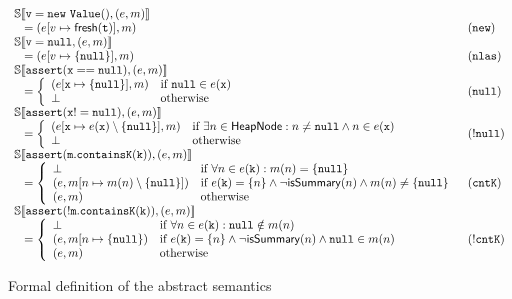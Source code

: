 \begin{figure*}
\[\begin{array}{ll}
\mathbb{S}\llbracket \mathtt{v = new\ Value()}, (e, m) \rrbracket\\
\;\;\;=  (e[v \mapsto \mathsf{fresh}(\mathtt{t})], m)& (\mathtt{new})\\
\mathbb{S}\llbracket \mathtt{v = null}, (e, m) \rrbracket\\
\;\;\;= (e[v \mapsto \{\mathtt{null}\}], m)& (\mathtt{nlas})\\
\mathbb{S}\llbracket \mathtt{assert(x==null)}, (e, m) \rrbracket\\
\;\;\;= \left\{
\begin{array}{ll}
(e[\mathtt{x} \mapsto \{\mathtt{null}\}], m) & \textrm{if } \mathtt{null} \in e(\mathtt{x})\\
\bot & \textrm{otherwise}\\
\end{array}
\right. & (\mathtt{null})\\
\mathbb{S}\llbracket \mathtt{assert(x!=null)}, (e, m) \rrbracket \\
\;\;\;=\left\{
\begin{array}{ll}
(e[\mathtt{x} \mapsto e(\mathtt{x}) \setminus \{\mathtt{null}\}], m) & \textrm{if } \exists n \in \mathsf{HeapNode} : n \neq \mathtt{null} \land n \in e(\mathtt{x})\\
\bot & \textrm{otherwise}\\
\end{array}
\right. & (\mathtt{!null})\\
\mathbb{S}\llbracket \mathtt{assert(m.containsK(k))}, (e, m) \rrbracket\\
\;\;\;= \left\{
\begin{array}{ll}
\bot & \textrm{if } \forall n \in e(\mathtt{k}) : m(n)=\{\mathtt{null}\}\\
(e, m[n \mapsto m(n)\setminus\{\mathtt{null}\}]) & \textrm{if } e(\mathtt{k}) = \{n\} \land \neg \mathsf{isSummary}(n) \land  m(n) \neq \{\mathtt{null}\}\\
(e, m) & \textrm{otherwise}\\
\end{array}
\right. & (\mathtt{cntK})\\
\mathbb{S}\llbracket \mathtt{assert(!m.containsK(k))}, (e, m) \rrbracket\\
\;\;\;= \left\{
\begin{array}{ll}
\bot & \textrm{if } \forall n \in e(\mathtt{k}) : \mathtt{null} \notin m(n)\\
(e, m[n \mapsto \{\mathtt{null}\}) & \textrm{if } e(\mathtt{k}) = \{n\} \land \neg \mathsf{isSummary}(n) \land \mathtt{null} \in m(n)\\
(e, m) & \textrm{otherwise}\\
\end{array}
\right. & (\mathtt{!cntK})\\
\end{array}
\]
\caption{Formal definition of the abstract semantics}
\label{fig:abstractsemantics}
\end{figure*}
